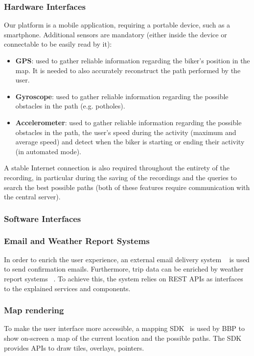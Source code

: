 \subsubsection{Hardware Interfaces}

Our platform is a mobile application, requiring a portable device, such as a smartphone. Additional sensors are mandatory (either inside the device or connectable to be easily read by it):
\begin{itemize}
    \item \textbf{GPS}: used to gather reliable information regarding the biker's position in the map. It is needed to also accurately reconstruct the path performed by the user.
    \item \textbf{Gyroscope}: used to gather reliable information regarding the possible obstacles in the path (e.g. potholes).
    \item \textbf{Accelerometer}: used to gather reliable information regarding the possible obstacles in the path, the user's speed during the activity (maximum and average speed) and detect when the biker is starting or ending their activity (in automated mode).
\end{itemize}
A stable Internet connection is also required throughout the entirety of the recording, in particular during the saving of the recordings and the queries to search the best possible paths (both of these features require communication with the central server).

\subsubsection{Software Interfaces}
\subsubsection*{Email and Weather Report Systems}
In order to enrich the user experience, an external email delivery system ~\cite{aws_ses_2025} is used to send confirmation emails. Furthermore, trip data can be enriched by weather report systems ~\cite{OpenWeatherMapAPI}. To achieve this, the system relies on REST APIs as interfaces to the explained services and components.

\subsubsection*{Map rendering}
To make the user interface more accessible, a mapping SDK~\cite{MapsSDK} is used by BBP to show on-screen a map of the current location and the possible paths. The SDK provides APIs to draw tiles, overlays, pointers.

